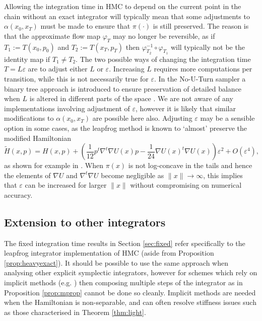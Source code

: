 \documentclass[bj,numbers,noshowframe]{imsart}
\newcommand{\e}{\varepsilon}
\theoremstyle{definition}
\theoremstyle{plain}
\theoremstyle{definition}
\begin{document}
Allowing the integration time in HMC to depend on the current point in the chain without an exact integrator will typically mean that some adjustments to $\alpha(x_0,x_T)$ must be made to ensure that $\pi(\cdot)$ is still preserved.  The reason is that the approximate flow map $\varphi_T$ may no longer be reversible, as if $T_1 := T(x_0,p_0)$ and $T_2 := T(x_T,p_T)$ then $\varphi^{-1}_{T_2} \circ \varphi_{T_1}$ will typically not be the identity map if $T_1 \neq T_2$.  The two possible ways of changing the integration time $T = L\e$ are to adjust either $L$ or $\e$.  Increasing $L$ requires more computations per transition, while this is not necessarily true for $\e$.  In the No-U-Turn sampler a binary tree approach is introduced to ensure preservation of detailed balance when $L$ is altered in different parts of the space \citep{hoffman-gelman:2013}.  We are not aware of any implementations involving adjustment of $\e$, however it is likely that similar modifications to $\alpha(x_0,x_T)$ are possible here also.  Adjusting $\e$ may be a sensible option in some cases, as the leapfrog method is known to `almost' preserve the modified Hamiltonian
\[
\tilde{H}(x,p) = H(x,p) + \left( \frac{1}{12} p^t \nabla^t\nabla U(x) p - \frac{1}{24}\nabla U(x)^t \nabla U(x) \right) \e^2 + O(\e^4),
\]
as shown for example in \citep{leimkuhler2004simulating}.  When $\pi(x)$ is not log-concave in the tails and hence the elements of $\nabla U$ and $\nabla^t \nabla U$ become negligible as $\|x\| \to \infty$, this implies that $\e$ can be increased for larger $\|x\|$ without compromising on numerical accuracy.

\subsection{Extension to other integrators}

The fixed integration time results in Section \ref{sec:fixed} refer specifically to the leapfrog integrator implementation of HMC (aside from Proposition \ref{prop:heavyexact}).  It should be possible to use the same approach when analysing other explicit symplectic integrators, however for schemes which rely on implicit methods (e.g. \citep{girolami2011riemann}) then composing multiple steps of the integrator as in Proposition \ref{prop:mprop} cannot be done so cleanly.  Implicit methods are needed when the Hamiltonian is non-separable, and can often resolve stiffness issues such as those characterised in Theorem \ref{thm:light}.
\end{document}
